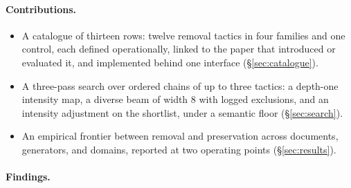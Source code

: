 \paragraph{Contributions.}
\begin{itemize}
  \item A catalogue of thirteen rows: twelve removal tactics in four families and one control, each defined operationally, linked to the paper that introduced or evaluated it, and implemented behind one interface (\S\ref{sec:catalogue}).
  \item A three-pass search over ordered chains of up to three tactics: a depth-one intensity map, a diverse beam of width $8$ with logged exclusions, and an intensity adjustment on the shortlist, under a semantic floor (\S\ref{sec:search}).
  \item An empirical frontier between removal and preservation across  documents,  generators, and  domains, reported at two operating points (\S\ref{sec:results}).
\end{itemize}

\paragraph{Findings.}

